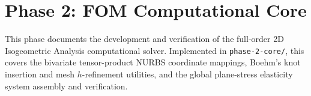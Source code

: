 \section{Phase 2: FOM Computational Core}
\label{sec:phase2}

This phase documents the development and verification of the full-order 2D Isogeometric Analysis computational solver. Implemented in \texttt{phase-2-core/}, this covers the bivariate tensor-product NURBS coordinate mappings, Boehm's knot insertion and mesh $h$-refinement utilities, and the global plane-stress elasticity system assembly and verification.



